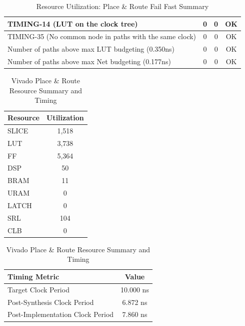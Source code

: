 \documentclass{article}
\begin{document}
\begin{table}[H]
\begin{tabular}{|l|c|c|c|}
    TIMING-14 (LUT on the clock tree)                                  & 0                  & 0               & OK              \\ \hline
    TIMING-35 (No common node in paths with the same clock)            & 0                  & 0               & OK              \\ \hline
    Number of paths above max LUT budgeting (0.350ns)                 & 0                  & 0               & OK              \\ \hline
    Number of paths above max Net budgeting (0.177ns)                 & 0                  & 0               & OK              \\ \hline
    \end{tabular}
    \caption{Resource Utilization: Place \& Route Fail Fast Summary}
    \label{tab:place-route-failfast-summary}
\end{table}

\vspace{5mm}

\begin{table}[H]
    \centering
    \begin{tabular}{|l|c|}
        \hline
        \textbf{Resource} & \textbf{Utilization} \\ \hline
        SLICE & 1,518 \\ \hline
        LUT & 3,738 \\ \hline
        FF & 5,364 \\ \hline
        DSP & 50 \\ \hline
        BRAM & 11 \\ \hline
        URAM & 0 \\ \hline
        LATCH & 0 \\ \hline
        SRL & 104 \\ \hline
        CLB & 0 \\ \hline
    \end{tabular}

    \vspace{5mm}

    \begin{tabular}{|l|c|}
        \hline
        \textbf{Timing Metric} & \textbf{Value} \\ \hline
        Target Clock Period & 10.000 ns \\ \hline
        Post-Synthesis Clock Period & 6.872 ns \\ \hline
        Post-Implementation Clock Period & 7.860 ns \\ \hline
    \end{tabular}
    \caption{Vivado Place \& Route Resource Summary and Timing}
    \label{tab:place-route-resource-timing}
\end{table}
\end{document}
